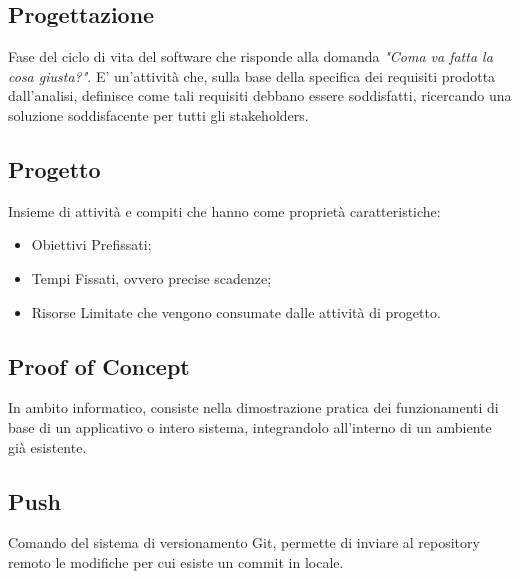 \subsection{Progettazione}
Fase del ciclo di vita del software che risponde alla domanda \textit{"Coma va fatta la cosa giusta?"}. E' un'attività che, sulla base della specifica dei requisiti prodotta dall'analisi, definisce come tali requisiti debbano essere soddisfatti, ricercando una soluzione soddisfacente per tutti gli stakeholders.

\subsection{Progetto}
Insieme di attività e compiti che hanno come proprietà caratteristiche:
\begin{itemize}
	\item Obiettivi Prefissati;
	\item Tempi Fissati, ovvero precise scadenze;
	\item Risorse Limitate che vengono consumate dalle attività di progetto.
\end{itemize}

\subsection{Proof of Concept}
In ambito informatico, consiste nella dimostrazione pratica dei funzionamenti di base di un applicativo o intero sistema, integrandolo all'interno di un ambiente già esistente.

\subsection{Push}
Comando del sistema di versionamento Git, permette di inviare al repository remoto le modifiche per cui esiste un commit in locale.